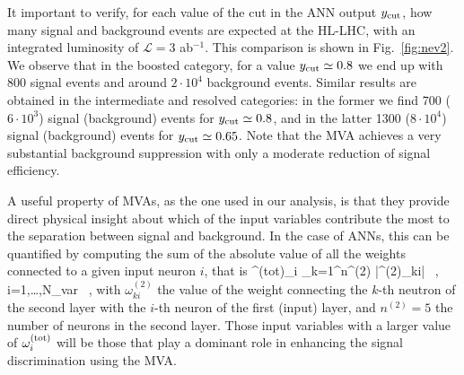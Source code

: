 It important to verify, for each value of
the cut in the ANN output $y_{\rm cut}$, how many
signal and background events are expected at the HL-LHC,
with an integrated luminosity of $\mathcal{L}=3$ ab$^{-1}$.
%
This comparison is shown in 
Fig.~\ref{fig:nev2}.
%
We observe that
in the boosted category, for a value $y_{\rm cut}\simeq 0.8$
we end up with 800 signal events and around $2\cdot 10^4$ background
events.
%
Similar results are obtained in the intermediate and resolved
categories: in the former we find 700 ($6\cdot 10^3$) signal (background)
events for $y_{\rm cut}\simeq 0.8$, and in the latter
1300 ($8\cdot 10^4$) signal (background) events for
$y_{\rm cut}\simeq 0.65$.
%
Note that the MVA achieves a very substantial background suppression
with only a
moderate reduction of signal efficiency.


A useful property of MVAs, as the one used in our
analysis,
is that they provide direct  physical insight about which of the
input variables contribute the most to the separation between
signal and background.
%
In the case of ANNs, this can be quantified by computing the sum
of the absolute value of all the weights connected to a given
input neuron $i$, that is
\be
\label{eq:totweight}
\omega^{\rm (tot)}_i \equiv \sum_{k=1}^{n^{(2)}} \Big|\omega^{(2)}_{ki}\Big| \, ,
\qquad i=1,\ldots,N_{\rm var} \, ,
\ee
with $\omega^{(2)}_{ki}$ the value of the weight connecting
the $k$-th neutron of the second layer with the $i$-th neuron of
the first (input) layer, and $n^{(2)}=5$ the number of
neurons in the second layer.
%
Those input variables with a larger value of $\omega^{\rm (tot)}_i$ will be those
that play a dominant role in enhancing the signal
discrimination using the MVA.


